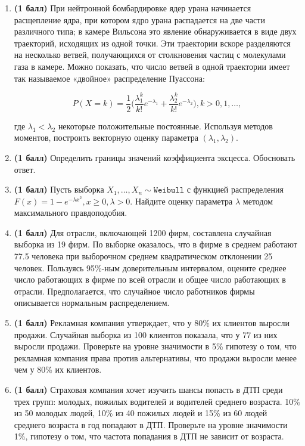 \documentclass{assignment}
\begin{document}

\begin{enumerate}
    \item \textbf{(1 балл)}  При нейтронной бомбардировке ядер урана начинается расщепление ядра, при котором ядро урана распадается на две части различного типа; в камере Вильсона это явление обнаруживается в виде двух траекторий, исходящих из одной точки. Эти траектории вскоре разделяются на несколько ветвей, получающихся от столкновения частиц с молекулами газа в камере. Можно показать, что число ветвей в одной траектории имеет так называемое «двойное» распределение Пуассона:

    $$P(X = k) = \frac{1}{2}\Big(\frac{\lambda_1^k}{k!}e^{-\lambda_1} + \frac{\lambda_2^k}{k!}e^{-\lambda_2} \Big), k > 0, 1, \ldots,$$

    где $\lambda_1 < \lambda_2$ некоторые положительные постоянные. Используя методов моментов, построить векторную оценку параметра $(\lambda_1, \lambda_2)$.
    
    \item \textbf{(1 балл)} Определить границы значений коэффициента эксцесса. Обосновать ответ. 

    \item \textbf{(1 балл)} Пусть выборка $X_1, \ldots, X_n \sim \texttt{Weibull}$ с функцией распределения $F(x) = 1 - e^{-\lambda x^2}, x \geq 0, \lambda > 0$. Найдите оценку параметра $\lambda$ методом максимального правдоподобия.

    \item \textbf{(1 балл)} Для отрасли, включающей 1200 фирм, составлена случайная выборка из 19 фирм. По выборке оказалось, что в фирме в среднем работают 77.5 человека при выборочном среднем квадратическом отклонении 25 человек. Пользуясь 95\%-ным доверительным интервалом, оцените среднее число работающих в фирме по всей отрасли и общее число работающих в отрасли. Предполагается, что случайное число работников фирмы описывается нормальным распределением.

    \item \textbf{(1 балл)} Рекламная компания утверждает, что у 80\% их клиентов выросли продажи. Случайная выборка из 100 клиентов показала, что у 77 из них выросли продажи. Проверьте на уровне значимости в 5\% гипотезу о том, что рекламная компания права против альтернативы, что продажи выросли менее чем у 80\% их клиентов.

    \item \textbf{(1 балл)} Страховая компания хочет изучить шансы попасть в ДТП среди трех групп: молодых, пожилых водителей и водителей среднего возраста. 10\% из 50 молодых людей, 10\% из 40 пожилых людей и 15\% из 60 людей среднего возраста в год попадают в ДТП. Проверьте на уровне значимости 1\%, гипотезу о том, что частота попадания в ДТП не зависит от возраста.


\end{enumerate}
\end{document}
